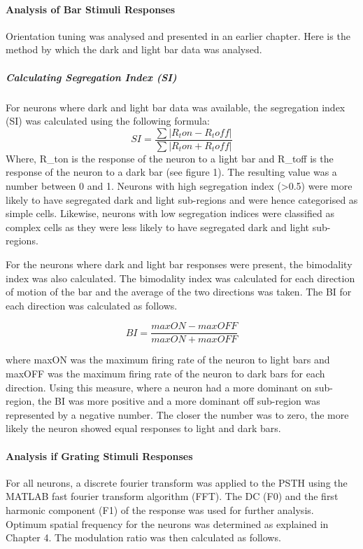 				\paragraph{Analysis of Bar Stimuli Responses}
				Orientation tuning was analysed and presented in an earlier chapter. Here is the method by which the dark and light bar data was analysed.
					\subparagraph{Calculating Segregation Index (SI)}
					For neurons where dark and light bar data was available, the segregation index (SI) was calculated using the following formula: 
					\[SI=\frac{\sum|R_ton-R_toff|}{\sum|R_ton+R_toff|}\]
					Where, R\_ton is the response of the neuron to a light bar and R\_toff is the response of the neuron to a dark bar (see figure 1). The resulting value was a number between 0 and 1. Neurons with high segregation index (>0.5) were more likely to have segregated dark and light sub-regions and were hence categorised as simple cells. Likewise, neurons with low segregation indices were classified as complex cells as they were less likely to have segregated dark and light sub-regions.
					
					For the neurons where dark and light bar responses were present, the bimodality index was also calculated. The bimodality index was calculated for each direction of motion of the bar and the average of the two directions was taken. The BI for each direction was calculated as follows.
					
					\[BI=\frac{maxON-maxOFF}{maxON+maxOFF}\]
					
					where maxON was the maximum firing rate of the neuron to light bars and maxOFF was the maximum firing rate of the neuron to dark bars for each direction. Using this measure, where a neuron had a more dominant on sub-region, the BI was more positive and a more dominant off sub-region was represented by a negative number. The closer the number was to zero, the more likely the neuron showed equal responses to light and dark bars.
				
				\paragraph{Analysis if Grating Stimuli Responses}
				
				For all neurons, a discrete fourier transform was applied to the PSTH using the MATLAB fast fourier transform algorithm (FFT). The DC (F0) and the first harmonic component (F1) of the response was used for further analysis. Optimum spatial frequency for the neurons was determined as explained in Chapter 4. The modulation ratio was then calculated as follows.
				
